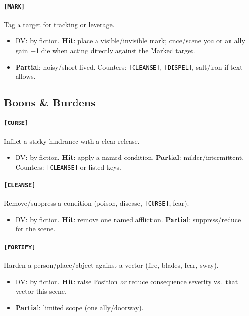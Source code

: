 \documentclass[11pt]{article}
\begin{document}
\paragraph{\texttt{[MARK]}} Tag a target for tracking or leverage.
\begin{itemize}
  \item DV: by fiction. \textbf{Hit}: place a visible/invisible mark; once/scene you or an ally gain +1 die when acting directly against the Marked target.
  \item \textbf{Partial}: noisy/short-lived. Counters: \texttt{[CLEANSE]}, \texttt{[DISPEL]}, salt/iron if text allows.
\end{itemize}

\subsection*{Boons \& Burdens}
\paragraph{\texttt{[CURSE]}} Inflict a sticky hindrance with a clear release.
\begin{itemize}
  \item DV: by fiction. \textbf{Hit}: apply a named condition. \textbf{Partial}: milder/intermittent. Counters: \texttt{[CLEANSE]} or listed keys.
\end{itemize}

\paragraph{\texttt{[CLEANSE]}} Remove/suppress a condition (poison, disease, \texttt{[CURSE]}, fear).
\begin{itemize}
  \item DV: by fiction. \textbf{Hit}: remove one named affliction. \textbf{Partial}: suppress/reduce for the scene.
\end{itemize}

\paragraph{\texttt{[FORTIFY]}} Harden a person/place/object against a vector (fire, blades, fear, sway).
\begin{itemize}
  \item DV: by fiction. \textbf{Hit}: raise Position \emph{or} reduce consequence severity vs.\ that vector this scene.
  \item \textbf{Partial}: limited scope (one ally/doorway).
\end{itemize}
\end{document}
